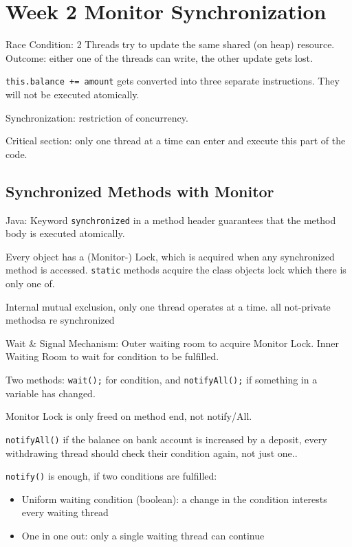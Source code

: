 \section{Week 2 Monitor Synchronization}

Race Condition: 2 Threads try to update the same shared (on heap) resource. 
Outcome: either one of the threads can write, the other update gets lost.

\verb|this.balance += amount| gets converted into three separate instructions. They will not be executed atomically.

Synchronization: restriction of concurrency.

Critical section: only one thread at a time can enter and execute this part of the code.

\subsection*{Synchronized Methods with Monitor}
Java: Keyword \verb|synchronized| in a method header guarantees that the method body is executed atomically.

Every object has a (Monitor-) Lock, which is acquired when any synchronized method is accessed. \verb|static| methods acquire the class objects lock which there is only one of.

Internal mutual exclusion, only one thread operates at a time. all not-private methodsa re synchronized

Wait \& Signal Mechanism: Outer waiting room to acquire Monitor Lock. Inner Waiting Room to wait for condition to be fulfilled.

Two methods: \verb|wait();| for condition, and \verb|notifyAll();| if something in a variable has changed.

Monitor Lock is only freed on method end, not notify/All.

\verb|notifyAll()| if the balance on bank account is increased by a deposit, every withdrawing thread should check their condition again, not just one.. 

\verb|notify()| is enough, if two conditions are fulfilled:\\
\begin{itemize}
    \item Uniform waiting condition (boolean): a change in the condition interests every waiting thread 
    \item One in one out: only a single waiting thread can continue
\end{itemize}

